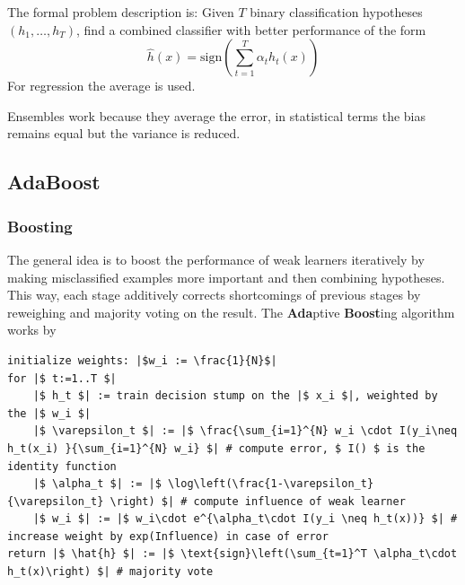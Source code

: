 \documentclass[11pt]{article}
\theoremstyle{definition}
\begin{document}
The formal problem description is: Given $T$ binary classification hypotheses $(h_1,\dots, h_T)$, find a combined classifier with better performance of the form
\begin{equation*}
	\hat{h}(x) = \text{sign}\left( \sum_{t=1}^{T} \alpha_t h_t (x) \right)
\end{equation*}
For regression the average is used.

Ensembles work because they average the error, in statistical terms the bias remains equal but the variance is reduced.

\subsection{AdaBoost}
\subsubsection{Boosting}
The general idea is to boost the performance of weak learners iteratively by making misclassified examples more important and then combining hypotheses. This way, each stage additively corrects shortcomings of previous stages by reweighing and majority voting on the result. The \textbf{Ada}ptive \textbf{Boost}ing algorithm works by
\begin{verbatim}
initialize weights: |$w_i := \frac{1}{N}$|
for |$ t:=1..T $|
	|$ h_t $| := train decision stump on the |$ x_i $|, weighted by the |$ w_i $|
	|$ \varepsilon_t $| := |$ \frac{\sum_{i=1}^{N} w_i \cdot I(y_i\neq h_t(x_i) }{\sum_{i=1}^{N} w_i} $| # compute error, $ I() $ is the identity function
	|$ \alpha_t $| := |$ \log\left(\frac{1-\varepsilon_t}{\varepsilon_t} \right) $| # compute influence of weak learner
	|$ w_i $| := |$ w_i\cdot e^{\alpha_t\cdot I(y_i \neq h_t(x))} $| # increase weight by exp(Influence) in case of error
return |$ \hat{h} $| := |$ \text{sign}\left(\sum_{t=1}^T \alpha_t\cdot h_t(x)\right) $| # majority vote
\end{verbatim}
\end{document}

